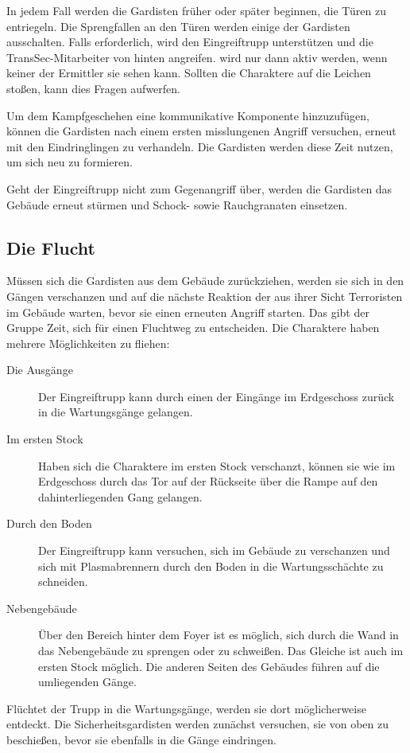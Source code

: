 In jedem Fall werden die Gardisten früher oder später beginnen, die Türen zu entriegeln. Die Sprengfallen an den Türen werden einige der Gardisten ausschalten. Falls erforderlich, wird \xl{} den Eingreiftrupp unterstützen und die TransSec-Mitarbeiter von hinten angreifen. \xl{} wird nur dann aktiv werden, wenn keiner der Ermittler sie sehen kann. Sollten die Charaktere auf die Leichen stoßen, kann dies Fragen aufwerfen.

Um dem Kampfgeschehen eine kommunikative Komponente hinzuzufügen, können die Gardisten nach einem ersten misslungenen Angriff versuchen, erneut mit den Eindringlingen zu verhandeln. Die Gardisten werden diese Zeit nutzen, um sich neu zu formieren.

Geht der Eingreiftrupp nicht zum Gegenangriff über, werden die Gardisten das Gebäude erneut stürmen und Schock- sowie Rauchgranaten einsetzen.

\subsection{Die Flucht}
Müssen sich die Gardisten aus dem Gebäude zurückziehen, werden sie sich in den Gängen verschanzen und auf die nächste Reaktion der aus ihrer Sicht Terroristen im Gebäude warten, bevor sie einen erneuten Angriff starten. Das gibt der Gruppe Zeit, sich für einen Fluchtweg zu entscheiden. Die Charaktere haben mehrere Möglichkeiten zu fliehen:

\begin{description}
	\item [Die Ausgänge] Der Eingreiftrupp kann durch einen der Eingänge im Erdgeschoss zurück in die Wartungsgänge gelangen.
	\item [Im ersten Stock] Haben sich die Charaktere im ersten Stock verschanzt, können sie wie im Erdgeschoss durch das Tor auf der
		Rückseite über die Rampe auf den dahinterliegenden Gang gelangen.
	\item [Durch den Boden] Der Eingreiftrupp kann versuchen, sich im Gebäude zu verschanzen und sich mit Plasmabrennern durch den Boden in	
		die Wartungsschächte zu schneiden.
	\item [Nebengebäude] Über den Bereich hinter dem Foyer ist es möglich, sich durch die Wand in das Nebengebäude zu sprengen oder zu	
		schweißen. Das Gleiche ist auch im ersten Stock möglich. Die anderen Seiten des Gebäudes führen auf die umliegenden Gänge.
\end{description}

Flüchtet der Trupp in die Wartungsgänge, werden sie dort möglicherweise entdeckt. Die Sicherheitsgardisten werden zunächst versuchen, sie von oben zu beschießen, bevor sie ebenfalls in die Gänge eindringen.

